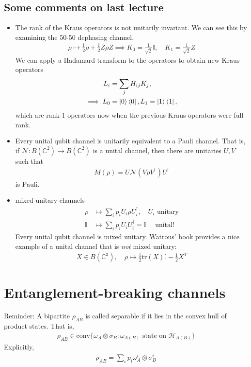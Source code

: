 \documentclass[10pt,oneside,longbibliography]{report}
\begin{document}
\subsection{Some comments on last lecture}
\begin{itemize}
    \item The rank of the Kraus operators is not unitarily invariant. We can see this by examining the 50-50 dephasing channel. 
    \begin{align}
        \rho \mapsto \frac{1}{2} \rho + \frac{1}{2} Z \rho Z \implies K_0 = \frac{1}{\sqrt{2}} \mathbb{I},\quad K_1 = \frac{1}{\sqrt{2}} Z
    \end{align}
    We can apply a Hadamard transform to the operators to obtain new Kraus operators
    \begin{align}
    L_i &= \sum_j H_{ij}K_j, \\
       \implies L_0 &= \ket{0}\bra{0}, L_1 = \ket{1}\bra{1},
    \end{align}
    which are rank-1 operators now when the previous Kraus operators were full rank. 
    \item Every unital qubit channel is unitarily equivalent to a Pauli channel. That is, if $\mathcal{N}: B(\mathbb{C}^2)\rightarrow B(\mathbb{C}^2)$ is a unital channel, then there are unitaries $U,V$ such that 
    \begin{align}
        M(\rho)= U\mathcal{N}(V \rho V^{\dagger})U^{\dagger}
    \end{align}
    is Pauli.
    \item mixed unitary channels 
    \begin{align}
        \rho &\mapsto \sum_i p_i U_i \rho U_i^{\dagger}, \quad U_i \text{ unitary}\\
        \mathbb{I} &\mapsto \sum_i p_i U_i U_i^{\dagger} = \mathbb{I} \quad \text{ unital! }
    \end{align}
    Every unital qubit channel is mixed unitary. Watrous' book provides a nice example of a unital channel that is \textit{not} mixed unitary:
    \begin{align}
        X \in B(\mathbb{C}^3), \quad \rho \mapsto \frac{1}{2}\text{tr}(X) \mathbb{I} -\frac{1}{2} X^T
    \end{align}
\end{itemize}

\section{Entanglement-breaking channels}
Reminder: A bipartite $\rho_{AB}$ is called separable if it lies in the convex hull of product states. That is,
\begin{align}
    \rho_{AB} \in \text{conv}\{\omega_A \otimes \sigma_B : \omega_{A(B)} \text{ state on } \mathcal{H}_{A(B)}\}
\end{align}
Explicitly, 
\begin{align}
    \rho_{AB} = \sum_i p_i \omega^i_A \otimes \sigma_B^i
\end{align}
\end{document}
